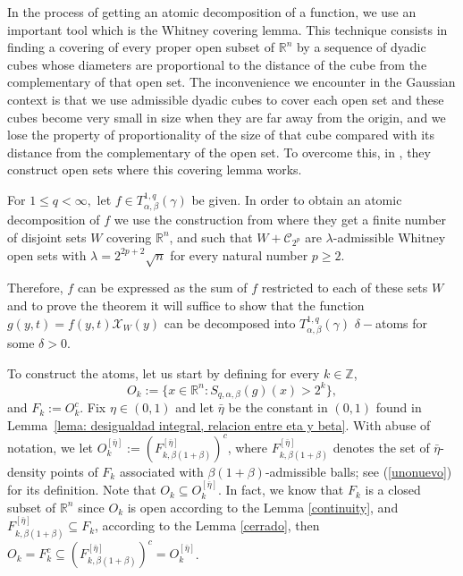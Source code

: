 \documentclass[leqno,11pt]{amsart}
\theoremstyle{plain}
\theoremstyle{remark}
\begin{document}
{{{In the process of getting an atomic decomposition of a function, we use an important tool which is the Whitney covering lemma. This technique consists in finding a covering of every proper open subset of $\mathbb{R}^n$ by a sequence of dyadic cubes whose diameters are proportional to the distance of the cube from the complementary of that open set. The inconvenience we encounter in the Gaussian context is that we use admissible dyadic cubes to cover each open set and these cubes become very small in size when they are far away from the origin, and we lose the property of proportionality of the size of that cube compared with its distance from the complementary of the open set. To overcome this, in \cite{MNP}, they construct open sets where this covering lemma works.  

{For $1\le q<\infty,$ let} $f\in T^{1,q}_{\alpha,\beta}(\gamma)$ be given. In order to obtain an atomic decomposition of $f$ we use the construction from \cite{MNP} where they get a finite number of disjoint sets $W$ covering ${\mathbb R}^n$, and such that $W+\mathscr{C}_{2^p}$ are $\lambda$-admissible Whitney open sets with $\lambda=2^{2p+2}\sqrt{n}$ for every natural number $p\ge 2.$  

Therefore, $f$ can be expressed as the sum of $f$ restricted to each of these sets $W$ and to prove the theorem it will suffice to show that the function $g(y,t)=f(y,t)\mathcal{X}_W (y)$ can be decomposed into $T^{1,q}_{\alpha, \beta}(\gamma)$ $\delta-$atoms for some $\delta>0.$ 

 
To construct the atoms, let us start by defining for every $k\in {\mathbb Z}$,
\[O_k:=\{x\in \mathbb R^n: S_{q,\alpha, \beta}(g)(x)>2^k\},\]
and $F_k:=O_k^c$. Fix $\eta\in (0,1)$ and let $\bar{\eta}$ be the constant in $(0,1)$ found in Lemma~\ref{lema: desigualdad integral, relacion entre eta y beta}. With abuse of notation, we let $O_k^{[\bar{\eta}]}:=\left(F_{k, \beta(1+\beta)}^{[\bar{\eta}]}\right)^c$, where $F_{k, \beta(1+\beta)}^{[\bar{\eta}]}$ denotes the set of $\bar{\eta}$-density points of $F_k$ associated with $\beta(1+\beta)$-admissible balls; see (\ref{unonuevo}) for its definition. Note that $O_k\subseteq O_k^{[\bar{\eta}]}$. In fact, we know that $F_k$ is a closed subset of $\mathbb R^n$ since $O_k$ is open according to the Lemma \ref{continuity}, and $F_{k, \beta(1+\beta)}^{[\bar{\eta}]}\subseteq F_k$, according to the Lemma \ref{cerrado}, then $O_k=F_k^c\subseteq \left(F_{k, \beta (1+\beta)}^{[\bar{\eta}]}\right)^c=O_k^{[\bar{\eta}]}$.
 
}}}
\end{document}
